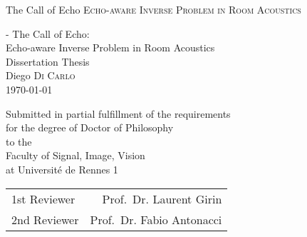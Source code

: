 \thispagestyle{empty}
{
    \begin{fullwidth}
        \centering
        \hphantom{.}
        \vfill
        {\Huge
            The Call of Echo
        }
        \mynewline
        {\Large
        \textsc{Echo-aware Inverse Problem in Room Acoustics}
        }
        \vfill
        \vfill
    \end{fullwidth}
}

\clearpage{}

\cleardoublepage{}

\thispagestyle{empty}
{
    \calccentering{\unitlength}
    \begin{adjustwidth*}{\unitlength}{-\unitlength}
        \raggedleft{}
        {\Huge\color{Burgundy}%
            The Call of Echo:\\
            Echo-aware Inverse Problem in Room Acoustics}\\[\baselineskip]
        {\LARGE%
        Dissertation Thesis}\\[0.2\textheight]
        {\huge%
        Diego \textsc{Di Carlo}}\\[\baselineskip]
        {\LARGE%
        \today}
        \vfill
        \vfill
        {\large%
        Submitted in partial fulfillment of the requirements\\
        for the degree of Doctor of Philosophy\\[\baselineskip]%

        to the\\[\baselineskip]

        Faculty of Signal, Image, Vision\\
        at Universit\'e de Rennes 1\\[2\baselineskip]

        \begin{minipage}{0.5\textwidth}
        \begin{tabular}{lr}
            1st\hspace{4pt} Reviewer & Prof.\ Dr. Laurent Girin\\
            2nd Reviewer & Prof.\ Dr.\; Fabio Antonacci
        \end{tabular}
        \end{minipage}
        \hspace*{36pt}

        \vfill
        }
        \vspace*{\baselineskip}
    \end{adjustwidth*}
}

